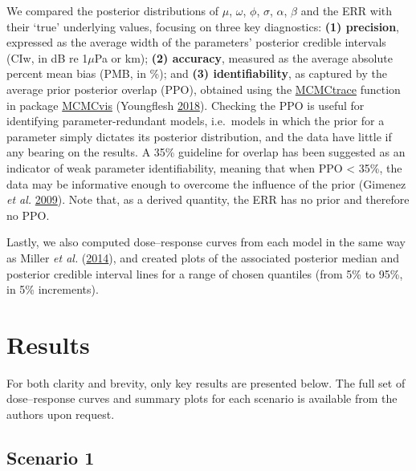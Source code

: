 \documentclass[
]{article}
\begin{document}
We compared the posterior distributions of \(\mu\), \(\omega\), \(\phi\), \(\sigma\), \(\alpha\), \(\beta\) and the ERR with their `true' underlying values, focusing on three key diagnostics: \textbf{(1) precision}, expressed as the average width of the parameters' posterior credible intervals (CIw, in dB re 1\(\mu\)Pa or km); \textbf{(2) accuracy}, measured as the average absolute percent mean bias (PMB, in \%); and \textbf{(3) identifiability}, as captured by the average prior posterior overlap (PPO), obtained using the \href{https://www.rdocumentation.org/packages/MCMCvis/versions/0.7.1/topics/MCMCtrace}{MCMCtrace} function in package \href{https://cran.r-project.org/web/packages/MCMCvis/index.html}{MCMCvis} (Youngflesh \protect\hyperlink{ref-Youngflesh2018}{2018}). Checking the PPO is useful for identifying parameter-redundant models, i.e.~models in which the prior for a parameter simply dictates its posterior distribution, and the data have little if any bearing on the results. A 35\% guideline for overlap has been suggested as an indicator of weak parameter identifiability, meaning that when PPO \textless{} 35\%, the data may be informative enough to overcome the influence of the prior (Gimenez \emph{et al.} \protect\hyperlink{ref-Gimenez2009}{2009}). Note that, as a derived quantity, the ERR has no prior and therefore no PPO.

Lastly, we also computed dose--response curves from each model in the same way as Miller \emph{et al.} (\protect\hyperlink{ref-Miller2014}{2014}), and created plots of the associated posterior median and posterior credible interval lines for a range of chosen quantiles (from 5\% to 95\%, in 5\% increments).

\section{Results}

For both clarity and brevity, only key results are presented below. The full set of dose--response curves and summary plots for each scenario is available from the authors upon request.

\subsection{Scenario 1}
\hypertarget{section51}{}
\end{document}
